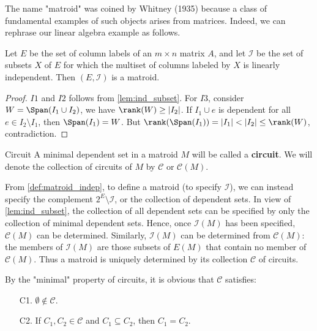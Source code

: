 \documentclass[a4paper,10pt]{article}
\renewcommand{\vocab}[1]{\textbf{#1}}
\newcommand{\II}{\mathcal{I}}
\newcommand{\CC}{\mathcal{C}}
\begin{document}
The name "matroid" was coined by Whitney (1935) because a class of fundamental examples of such objects arises from matrices. Indeed, we can rephrase our linear algebra example as follows.

\begin{theorem}{}
  Let $E$ be the set of column labels of an $m\times n$ matrix $A$, and let $\II$ be the set of subsets $X$ of $E$ for which the multiset of columns labeled by $X$ is linearly independent. Then $(E,\II)$ is a matroid.
  \begin{proof}
    $I1$ and $I2$ follows from \cref{lem:ind_subset}. For $I3$, consider $W=\Span(I_1\cup I_2)$, we have $\rank(W)\geq |I_2|$. If $I_1\cup e$ is dependent for all $e\in I_2\setminus I_1$, then $\Span(I_1)=W$. But $\rank(\Span(I_1))=|I_1|<|I_2|\leq \rank(W)$, contradiction.
  \end{proof}
\end{theorem}


\begin{definition}[def:]{Circuit}
  A minimal dependent set in a matroid $M$ will be called a \vocab{circuit}. We will denote the collection of circuits of $M$ by $\CC$ or $\CC(M)$.
\end{definition}

From \cref{def:matroid_indep}, to define a matroid (to specify $\II$), we can instead specify the complement $2^E\setminus \II$, or the collection of dependent sets. In view of \cref{lem:ind_subset}, the collection of all dependent sets can be specified by only the collection of minimal dependent sets. Hence, once $\II(M)$ has been specified, $\CC(M)$ can be determined. Similarly, $\II(M)$ can be determined from $\CC(M)$: the members of $\II(M)$ are those subsets of $E(M)$ that contain no member of $\CC(M)$.
Thus a matroid is uniquely determined by its collection $\CC$ of circuits.

By the "minimal" property of circuits, it is obvious that $\CC$ satisfies:
\begin{enumerate}
  \item [C1.] $\emptyset \not\in \CC$.
  \item [C2.] If $C_1, C_2\in \CC$ and $C_1\subseteq C_2$, then $C_1=C_2$.
\end{enumerate}
\end{document}
